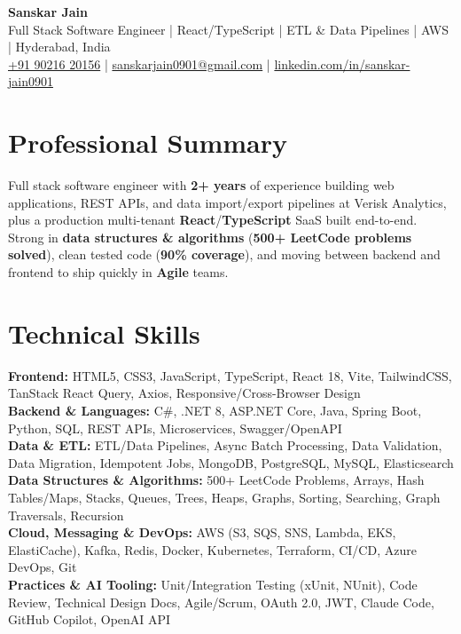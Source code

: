 \documentclass[letterpaper,10pt]{article}
\begin{document}
\begin{center}
    {\LARGE \textbf{Sanskar Jain}} \\
    Full Stack Software Engineer \;|\; React/TypeScript \;|\; ETL \& Data Pipelines \;|\; AWS \;|\; Hyderabad, India \\
    \href{tel:+919021620156}{+91 90216 20156} \;|\;
    \href{mailto:sanskarjain0901@gmail.com}{sanskarjain0901@gmail.com} \;|\;
    \href{https://www.linkedin.com/in/sanskar-jain0901/}{linkedin.com/in/sanskar-jain0901}
\end{center}

\section*{Professional Summary}
Full stack software engineer with \textbf{2+ years} of experience building web applications, REST APIs, and data import/export pipelines at Verisk Analytics, plus a production multi-tenant \textbf{React}/\textbf{TypeScript} SaaS built end-to-end. Strong in \textbf{data structures \& algorithms} (\textbf{500+ LeetCode problems solved}), clean tested code (\textbf{90\% coverage}), and moving between backend and frontend to ship quickly in \textbf{Agile} teams.

\section*{Technical Skills}
\begin{sloppypar}
\noindent
\textbf{Frontend:} HTML5, CSS3, JavaScript, TypeScript, React 18, Vite, TailwindCSS, TanStack React Query, Axios, Responsive/Cross-Browser Design \\
\textbf{Backend \& Languages:} C\#, .NET 8, ASP.NET Core, Java, Spring Boot, Python, SQL, REST APIs, Microservices, Swagger/OpenAPI \\
\textbf{Data \& ETL:} ETL/Data Pipelines, Async Batch Processing, Data Validation, Data Migration, Idempotent Jobs, MongoDB, PostgreSQL, MySQL, Elasticsearch \\
\textbf{Data Structures \& Algorithms:} 500+ LeetCode Problems, Arrays, Hash Tables/Maps, Stacks, Queues, Trees, Heaps, Graphs, Sorting, Searching, Graph Traversals, Recursion \\
\textbf{Cloud, Messaging \& DevOps:} AWS (S3, SQS, SNS, Lambda, EKS, ElastiCache), Kafka, Redis, Docker, Kubernetes, Terraform, CI/CD, Azure DevOps, Git \\
\textbf{Practices \& AI Tooling:} Unit/Integration Testing (xUnit, NUnit), Code Review, Technical Design Docs, Agile/Scrum, OAuth 2.0, JWT, Claude Code, GitHub Copilot, OpenAI API
\end{sloppypar}
\end{document}
